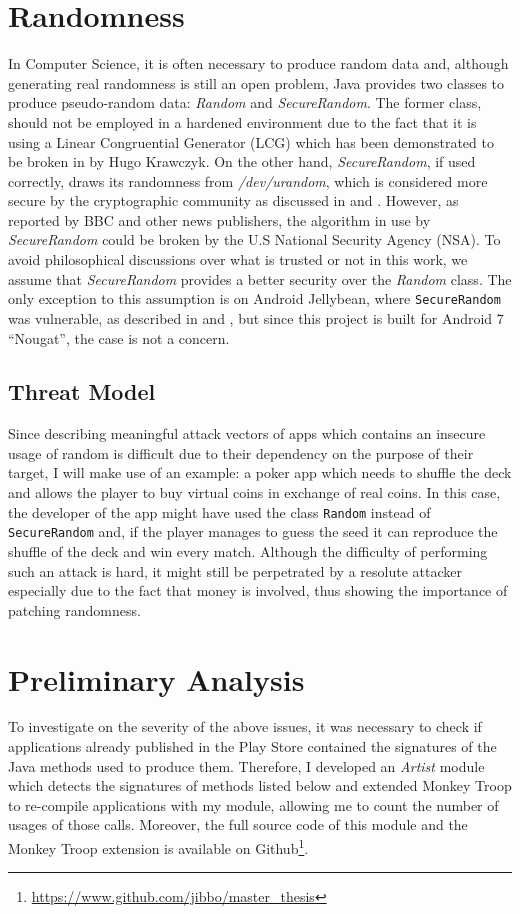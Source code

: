\section{Randomness}
\label{sec:randominvestigation}
In Computer Science, it is often necessary to produce random data and, although generating real randomness is still an open problem, Java provides two classes to produce pseudo-random data: \emph{Random} and \emph{SecureRandom}. The former class, should not be employed in a hardened environment due to the fact that it is using a Linear Congruential Generator (LCG) which has been demonstrated to be broken in \cite{lcgbreak} by Hugo Krawczyk. On the other hand, \emph{SecureRandom}, if used correctly, draws its randomness from \emph{/dev/urandom}, which is considered more secure by the cryptographic community as discussed in \cite{secrandom} and \cite{urandom}. However, as reported by BBC\cite{bbc} and other news publishers, the algorithm in use by \emph{SecureRandom} could be broken by the U.S National Security Agency (NSA). To avoid philosophical discussions over what is trusted or not in this work, we assume that \emph{SecureRandom} provides a better security over the \emph{Random} class. The only exception to this assumption is on Android Jellybean, where \texttt{SecureRandom} was vulnerable, as described in \cite{bitcoinalert} and \cite{randomalert}, but since this project is built for Android 7 \enquote{Nougat}, the case is not a concern.

\subsection{Threat Model}
Since describing meaningful attack vectors of apps which contains an insecure usage of random is difficult due to their dependency on the purpose of their target, I will make use of an example: a poker app which needs to shuffle the deck and allows the player to buy virtual coins in exchange of real coins. In this case, the developer of the app might have used the class \texttt{Random} instead of \texttt{SecureRandom} and, if the player manages to guess the seed it can reproduce the shuffle of the deck and win every match. Although the difficulty of performing such an attack is hard, it might still be perpetrated by a resolute attacker especially due to the fact that money is involved, thus showing the importance of patching randomness.

\section{Preliminary Analysis}
\label{sc:preliminaryanalysis}
To investigate on the severity of the above issues, it was necessary to check if applications already published in the Play Store contained the signatures of the Java methods used to produce them. Therefore, I developed an \emph{Artist} module which detects the signatures of methods listed below and extended Monkey Troop to re-compile applications with my module, allowing me to count the number of usages of those calls. Moreover, the full source code of this module and the Monkey Troop extension is available on Github\footnote{\url{https://www.github.com/jibbo/master_thesis}}.

